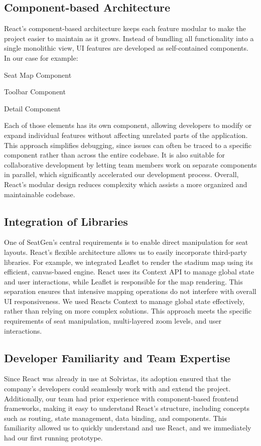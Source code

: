 \subsection{Component-based Architecture}
React’s component-based architecture keeps each feature modular to make the project easier to maintain as it grows. Instead of bundling all functionality into a single monolithic view, UI features are developed as self-contained components. In our case for example:
\begin{compactitem}
    \item Seat Map Component
    \item Toolbar Component
    \item Detail Component
\end{compactitem}
Each of those elements has its own component, allowing developers to modify or expand individual features without affecting unrelated parts of the application. This approach simplifies debugging, since issues can often be traced to a specific component rather than across the entire codebase. It is also suitable for collaborative development by letting team members work on separate components in parallel, which significantly accelerated our development process. Overall, React’s modular design reduces complexity which assists a more organized and maintainable codebase.
~\cite{ReactCBA01, ReactCBA02, ReactCBA03}

\subsection{Integration of Libraries}
One of SeatGen’s central requirements is to enable direct manipulation for seat layouts. React’s flexible architecture allows us to easily incorporate third-party libraries. For example, we integrated Leaflet to render the stadium map using its efficient, canvas-based engine. React uses its Context API to manage global state and user interactions, while Leaflet is responsible for the map rendering. This separation ensures that intensive mapping operations do not interfere with overall UI responsiveness. We used Reacts Context to manage global state effectively, rather than relying on more complex solutions. This approach meets the specific requirements of seat manipulation, multi-layered zoom levels, and user interactions.

\subsection{Developer Familiarity and Team Expertise}
Since React was already in use at Solvistas, its adoption ensured that the company’s developers could seamlessly work with and extend the project. Additionally, our team had prior experience with component-based frontend frameworks, making it easy to understand React’s structure, including concepts such as routing, state management, data binding, and components. This familiarity allowed us to quickly understand and use React, and we immediately had our first running prototype.

